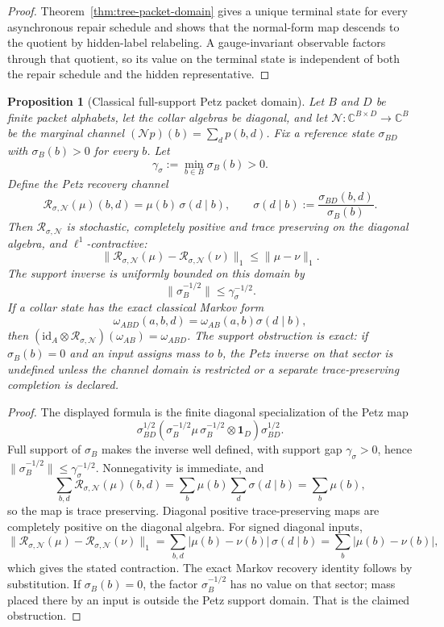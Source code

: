 \documentclass[11pt]{article}
\newtheorem{proposition}[theorem]{Proposition}
\theoremstyle{remark}
\theoremstyle{plain}
\begin{document}
\begin{proof}
Theorem~\ref{thm:tree-packet-domain} gives a unique terminal state for every asynchronous repair
schedule and shows that the normal-form map descends to the quotient by hidden-label relabeling.
A gauge-invariant observable factors through that quotient, so its value on the terminal state is
independent of both the repair schedule and the hidden representative.
\end{proof}

\begin{proposition}[Classical full-support Petz packet domain]\label{prop:classical-petz-packet}
Let \(B\) and \(D\) be finite packet alphabets, let the collar algebras be diagonal, and let
\(\mathcal N:\mathbb C^{B\times D}\to\mathbb C^B\) be the marginal channel
\((\mathcal N p)(b)=\sum_d p(b,d)\). Fix a reference state \(\sigma_{BD}\) with
\(\sigma_B(b)>0\) for every \(b\). Let
\[
\gamma_\sigma:=\min_{b\in B}\sigma_B(b)>0.
\]
Define the Petz recovery channel
\[
\mathcal R_{\sigma,\mathcal N}(\mu)(b,d)
=
\mu(b)\,\sigma(d\mid b),
\qquad
\sigma(d\mid b):=\frac{\sigma_{BD}(b,d)}{\sigma_B(b)}.
\]
Then \(\mathcal R_{\sigma,\mathcal N}\) is stochastic, completely positive and trace preserving
on the diagonal algebra, and \(\ell^1\)-contractive:
\[
\|\mathcal R_{\sigma,\mathcal N}(\mu)-\mathcal R_{\sigma,\mathcal N}(\nu)\|_1
\le
\|\mu-\nu\|_1.
\]
The support inverse is uniformly bounded on this domain by
\[
\|\sigma_B^{-1/2}\|\le \gamma_\sigma^{-1/2}.
\]
If a collar state has the exact classical Markov form
\[
\omega_{ABD}(a,b,d)=\omega_{AB}(a,b)\sigma(d\mid b),
\]
then \((\mathrm{id}_A\otimes\mathcal R_{\sigma,\mathcal N})(\omega_{AB})=\omega_{ABD}\).
The support obstruction is exact: if \(\sigma_B(b)=0\) and an input assigns mass to \(b\), the
Petz inverse on that sector is undefined unless the channel domain is restricted or a separate
trace-preserving completion is declared.
\end{proposition}

\begin{proof}
The displayed formula is the finite diagonal specialization of the Petz map
\[
\sigma_{BD}^{1/2}
\left(\sigma_B^{-1/2}\mu\,\sigma_B^{-1/2}\otimes \mathbf 1_D\right)
\sigma_{BD}^{1/2}.
\]
Full support of \(\sigma_B\) makes the inverse well defined, with support gap
\(\gamma_\sigma>0\), hence \(\|\sigma_B^{-1/2}\|\le\gamma_\sigma^{-1/2}\). Nonnegativity is immediate, and
\[
\sum_{b,d}\mathcal R_{\sigma,\mathcal N}(\mu)(b,d)
=
\sum_b \mu(b)\sum_d\sigma(d\mid b)
=
\sum_b\mu(b),
\]
so the map is trace preserving. Diagonal positive trace-preserving maps are completely positive on
the diagonal algebra. For signed diagonal inputs,
\[
\|\mathcal R_{\sigma,\mathcal N}(\mu)-\mathcal R_{\sigma,\mathcal N}(\nu)\|_1
=
\sum_{b,d}|\mu(b)-\nu(b)|\,\sigma(d\mid b)
=
\sum_b|\mu(b)-\nu(b)|,
\]
which gives the stated contraction. The exact Markov recovery identity follows by substitution.
If \(\sigma_B(b)=0\), the factor \(\sigma_B^{-1/2}\) has no value on that sector; mass placed
there by an input is outside the Petz support domain. That is the claimed obstruction.
\end{proof}
\end{document}
